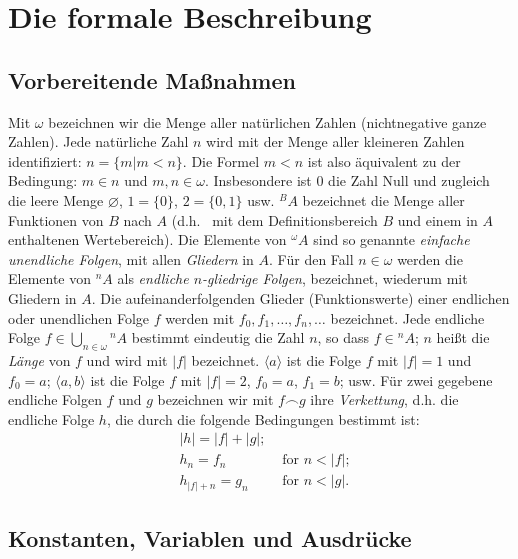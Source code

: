 \section{Die formale Beschreibung}

\subsection[Vorbereitende Maßnahmen]{Vorbereitende Maßnahmen\protect\footnotemark}%

Mit $\omega$ bezeichnen wir die Menge aller natürlichen Zahlen (nichtnegative ganze Zahlen). Jede natürliche Zahl $n$ wird mit der Menge aller kleineren Zahlen identifiziert: $n = \{ m | m < n \}$.  Die Formel $m < n$ ist also äquivalent zu der Bedingung: $m \in n$ und $m,n \in \omega$. Insbesondere ist 0 die Zahl Null und zugleich die leere Menge $\varnothing$, $1=\{0\}$, $2=\{0,1\}$ usw. ${}^B A$ bezeichnet die Menge aller Funktionen von  $B$ nach $A$ (d.h. \ mit dem Definitionsbereich $B$ und einem in $A$ enthaltenen Wertebereich).  Die Elemente von ${}^\omega A$ sind so genannte {\em einfache unendliche Folgen}, mit allen {\em Gliedern} in $A$.  Für den Fall $n \in \omega$ werden die Elemente von ${}^n A$ als {\em endliche $n$-gliedrige Folgen}, bezeichnet, wiederum mit Gliedern in $A$.  Die aufeinanderfolgenden Glieder (Funktionswerte) einer endlichen oder unendlichen Folge $f$ werden mit $f_0, f_1, \ldots ,f_n,\ldots$ bezeichnet.  Jede endliche Folge $f \in \bigcup _{n \in \omega} {}^n A$ bestimmt eindeutig die Zahl $n$, so dass $f \in {}^n A$; $n$ heißt die {\em Länge} von $f$ und wird mit $|f|$ bezeichnet.  $\langle a \rangle$ ist die Folge $f$ mit $|f|=1$ und $f_0=a$; $\langle a,b \rangle$ ist die Folge $f$ mit $|f|=2$, $f_0=a$, $f_1=b$; usw.  Für zwei gegebene endliche Folgen $f$ und $g$ bezeichnen wir mit $f\frown g$ ihre {\em Verkettung}, d.h. die endliche Folge $h$, die durch die folgende Bedingungen bestimmt ist:
\begin{eqnarray*}
& |h| = |f|+|g|;&  \\
& h_n = f_n & \mbox{\ for\ } n < |f|;  \\
& h_{|f|+n} = g_n & \mbox{\ for\ } n < |g|.
\end{eqnarray*}

\subsection{Konstanten, Variablen und Ausdrücke}

